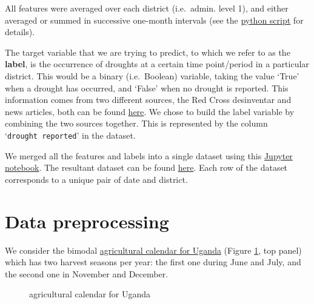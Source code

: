 \documentclass[10pt,parskip=half,
toc=sectionentrywithdots,
bibliography=totocnumbered,
captions=tableheading,numbers=noendperiod]{scrartcl}
\begin{document}
All features were averaged over each district (i.e.~admin. level 1), and
either averaged or summed in successive one-month intervals (see the
\href{https://github.com/rodekruis/Drought_IBF/blob/master/GoogleEarthEngine/GEE_get_data.py}{python
script} for details).

The target variable that we are trying to predict, to which we refer to
as the \textbf{label}, is the occurrence of droughts at a certain time
point/period in a particular district. This would be a binary
(i.e.~Boolean) variable, taking the value `True' when a drought has
occurred, and `False' when no drought is reported. This information
comes from two different sources, the Red Cross desinventar and news
articles, both can be found
\href{https://rodekruis.sharepoint.com/sites/510-CRAVK-510/Gedeelde\%20\%20documenten/Forms/AllItems.aspx?RootFolder=\%2Fsites\%2F510\%2DCRAVK\%2D510\%2FGedeelde\%20\%20documenten\%2F\%5BCTRY\%5D\%20Uganda\%2F2\%2D\%20IBF\%20DROUGHT\%20UGANDA\%2FDROUGHT\%20EVENTS\%20\%26\%20IMPACT\%20ANALYSIS\&FolderCTID=0x012000D122CA8FA5B68345A13A32EDAA653915}{here}.
We chose to build the label variable by combining the two sources
together. This is represented by the column `\texttt{drought\ reported}'
in the dataset.

We merged all the features and labels into a single dataset using this
\href{https://github.com/rodekruis/Drought_IBF/blob/master/Model\%20Event\%20Data/combining\%20satellite\%20data\%20with\%20desinventar\%20events\%20and\%20news\%20article\%20events\%20.ipynb}{Jupyter
notebook}. The resultant dataset can be found
\href{https://github.com/rodekruis/Drought_IBF/blob/master/Model\%20Event\%20Data/datasets/Droughts_satelite_and_events.csv}{here}.
Each row of the dataset corresponds to a unique pair of date and
district.

\hypertarget{data-preprocessing}{%
\section{Data preprocessing}\label{data-preprocessing}}

We consider the bimodal
\href{https://fews.net/east-africa/uganda}{agricultural calendar for
Uganda} (Figure \ref{fig:calendar}, top panel) which has two harvest
seasons per year: the first one during June and July, and the second one
in November and December.

\begin{figure}[]
\hypertarget{fig:calendar}{%
\begin{center}
\end{center}
\caption{agricultural calendar for Uganda}\label{fig:calendar}
}
\end{figure}
\end{document}
